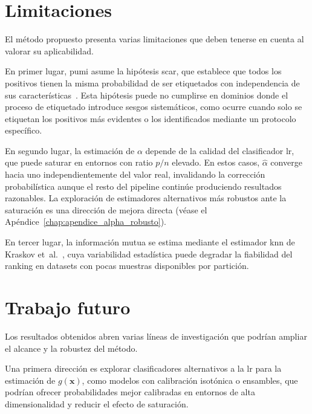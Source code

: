 \section{Limitaciones}
\label{sec:limitaciones}

El método propuesto presenta varias limitaciones que deben tenerse en cuenta al valorar su aplicabilidad.

En primer lugar, \acrshort{pumi} asume la hipótesis \acrshort{scar}, que establece que todos los positivos tienen la misma probabilidad de ser etiquetados con independencia de sus características~\cite{elkan2008learning}. Esta hipótesis puede no cumplirse en dominios donde el proceso de etiquetado introduce sesgos sistemáticos, como ocurre cuando solo se etiquetan los positivos más evidentes o los identificados mediante un protocolo específico.

En segundo lugar, la estimación de $\alpha$ depende de la calidad del clasificador \acrshort{lr}, que puede saturar en entornos con ratio $p/n$ elevado. En estos casos, $\hat{\alpha}$ converge hacia uno independientemente del valor real, invalidando la corrección probabilística aunque el resto del pipeline continúe produciendo resultados razonables. La exploración de estimadores alternativos más robustos ante la saturación es una dirección de mejora directa (véase el Apéndice~\ref{chap:apendice_alpha_robusto}).

En tercer lugar, la información mutua se estima mediante el estimador \acrshort{knn} de Kraskov et~al.~\cite{kraskov2004estimating}, cuya variabilidad estadística puede degradar la fiabilidad del ranking en datasets con pocas muestras disponibles por partición.

\section{Trabajo futuro}
\label{sec:trabajo_futuro}

Los resultados obtenidos abren varias líneas de investigación que podrían ampliar el alcance y la robustez del método.

Una primera dirección es explorar clasificadores alternativos a la \acrshort{lr} para la estimación de $g(\mathbf{x})$, como modelos con calibración isotónica o ensambles, que podrían ofrecer probabilidades mejor calibradas en entornos de alta dimensionalidad y reducir el efecto de saturación.

